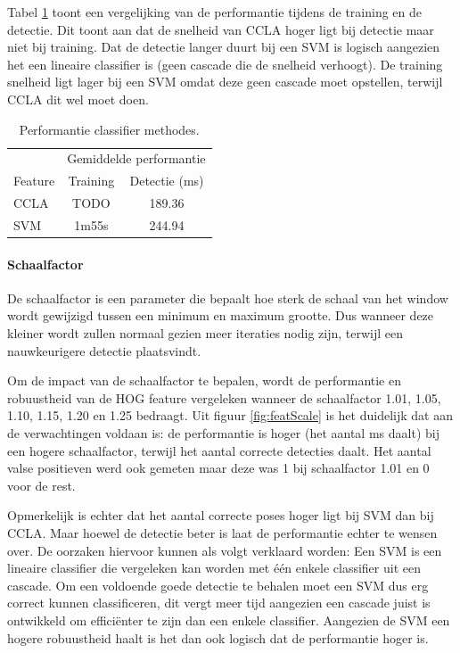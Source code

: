 Tabel \ref{tab:class_perf} toont een vergelijking van de performantie tijdens de training en de detectie. Dit toont aan dat de snelheid van CCLA hoger ligt bij detectie maar niet bij training. Dat de detectie langer duurt bij een SVM is logisch aangezien het een lineaire classifier is (geen cascade die de snelheid verhoogt). De training snelheid ligt lager bij een SVM omdat deze geen cascade moet opstellen, terwijl CCLA dit wel moet doen.

\begin{table}
  \centering
  \begin{tabular}{@{}lcc@{}} \toprule
    & \multicolumn{2}{c}{Gemiddelde performantie} \\ \cmidrule(r){2-3}
    Feature & Training & Detectie (ms)\\ \midrule
    CCLA & TODO & 189.36 \\
    SVM & 1m55s & 244.94 \\ \bottomrule
  \end{tabular}
  \caption{Performantie classifier methodes.}
  \label{tab:class_perf}
\end{table}

\paragraph{Schaalfactor}

De schaalfactor is een parameter die bepaalt hoe sterk de schaal van het window wordt gewijzigd tussen een minimum en maximum grootte. Dus wanneer deze kleiner wordt zullen normaal gezien meer iteraties nodig zijn, terwijl een nauwkeurigere detectie plaatsvindt.

Om de impact van de schaalfactor te bepalen, wordt de performantie en robuustheid van de HOG feature vergeleken wanneer de schaalfactor 1.01, 1.05, 1.10, 1.15, 1.20 en 1.25 bedraagt. Uit figuur \ref{fig:featScale} is het duidelijk dat aan de verwachtingen voldaan is: de performantie is hoger (het aantal ms daalt) bij een hogere schaalfactor, terwijl het aantal correcte detecties daalt. Het aantal valse positieven werd ook gemeten maar deze was 1 bij schaalfactor 1.01 en 0 voor de rest.

Opmerkelijk is echter dat het aantal correcte poses hoger ligt bij SVM dan bij CCLA. Maar hoewel de detectie beter is laat de performantie echter te wensen over. De oorzaken hiervoor kunnen als volgt verklaard worden: Een SVM is een lineaire classifier die vergeleken kan worden met \'e\'en enkele classifier uit een cascade. Om een voldoende goede detectie te behalen moet een SVM dus erg correct kunnen classificeren, dit vergt meer tijd aangezien een cascade juist is ontwikkeld om effici\"enter te zijn dan een enkele classifier. Aangezien de SVM een hogere robuustheid haalt is het dan ook logisch dat de performantie hoger is.

